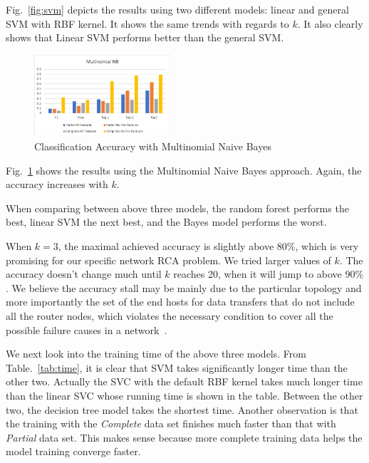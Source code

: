 Fig.~\ref{fig:svm} depicts the results using two different models: linear and general SVM with RBF kernel. It shows the same trends with regards to $k$. It also clearly shows that Linear SVM performs better than the general SVM.
\begin{figure}[!ht]
\begin{center}
\includegraphics[width=0.45\textwidth]{./figure/nb-accuracy}
\end{center}
\vspace{-0.05in}
\caption{Classification Accuracy with Multinomial Naive Bayes}
\vspace{-0.05in}
\label{fig:bn}
\end{figure}

Fig.~\ref{fig:bn} shows the results using the Multinomial Naive Bayes approach. Again, the accuracy increases with $k$.

When comparing between above three models, the random forest performs the best, linear SVM the next best, and the Bayes model performs the worst. 

When $k=3$, the maximal achieved accuracy is slightly above $80\%$, which is very promising for our specific network RCA problem. We tried larger values of $k$. The accuracy doesn't change much until $k$ reaches 20, when it will jump to above $90\%$. We believe the accuracy stall may be mainly due to the particular topology and more importantly the set of the end hosts for data transfers that do not include all the router nodes, which violates the necessary condition to cover all the possible failure causes in a network~\cite{netbouncer:nsdi18}.  

We next look into the training time of the above three models. From Table.~\ref{tab:time}, it is clear that SVM takes significantly longer time than the other two. Actually the SVC with the default RBF kernel takes much longer time than the linear SVC whose running time is shown in the table. Between the other two, the decision tree model takes the shortest time. Another observation is that the training with the {\it Complete} data set finishes much faster than that with {\it Partial} data set. This makes sense because more complete training data helps the model training converge faster. 

